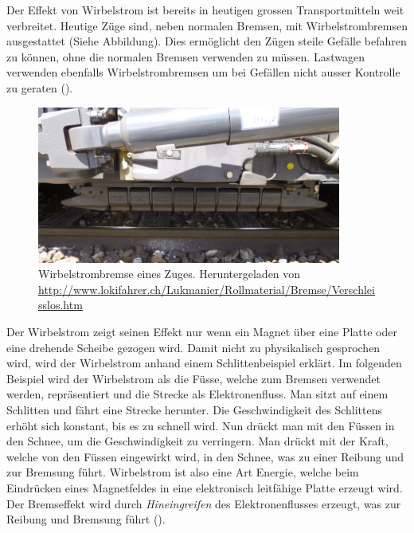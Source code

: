 Der Effekt von Wirbelstrom ist bereits in heutigen grossen Transportmitteln weit verbreitet. Heutige Züge sind, neben normalen Bremsen, mit Wirbelstrombremsen ausgestattet (Siehe Abbildung). Dies ermöglicht den Zügen steile Gefälle befahren zu können, ohne die normalen Bremsen verwenden zu müssen. Lastwagen verwenden ebenfalls Wirbelstrombremsen um bei Gefällen nicht ausser Kontrolle zu geraten (\cite{lokifahrer}).
\begin{figure}[ht]
    \begin{center}
      \includegraphics[width=10cm]{assets/images/magnetismus/zug_wirbelstrombremse}
    \end{center}
    \vspace{-3ex}
    \caption{Wirbelstrombremse eines Zuges. Heruntergeladen von \url{http://www.lokifahrer.ch/Lukmanier/Rollmaterial/Bremse/Verschleisslos.htm}}
    \label{fig:zug_wirbelstrombremse}
\end{figure}

Der Wirbelstrom zeigt seinen Effekt nur wenn ein Magnet über eine Platte oder eine drehende Scheibe gezogen wird. Damit nicht zu physikalisch gesprochen wird, wird der Wirbelstrom anhand einem Schlittenbeispiel erklärt. Im folgenden Beispiel wird der Wirbelstrom als die Füsse, welche zum Bremsen verwendet werden, repräsentiert und die Strecke als Elektronenfluss.
\newpara
Man sitzt auf einem Schlitten und fährt eine Strecke herunter. Die Geschwindigkeit des Schlittens erhöht sich konstant, bis es zu schnell wird. Nun drückt man mit den Füssen in den Schnee, um die Geschwindigkeit zu verringern. Man drückt mit der Kraft, welche von den Füssen eingewirkt wird, in den Schnee, was zu einer Reibung und zur Bremsung führt.
\newpara
Wirbelstrom ist also eine Art Energie, welche beim Eindrücken eines Magnetfeldes in eine elektronisch leitfähige Platte erzeugt wird. Der Bremseffekt wird durch \textit{Hineingreifen} des Elektronenflusses erzeugt, was zur Reibung und Bremsung führt (\cite{schulmaterial_magnetismus}). 
\newpage
